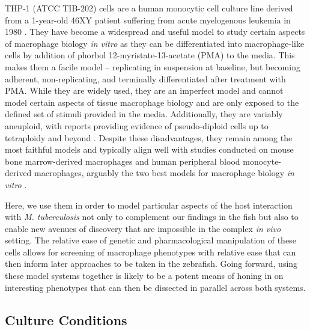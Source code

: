 THP-1 (ATCC TIB-202) cells are a human monocytic cell culture line derived from a 1-year-old 46XY patient suffering from acute myelogenous leukemia in 1980 \citep{Tsuchiya1980}. They have become a widespread and useful model to study certain aspects of macrophage biology \textit{in vitro} as they can be differentiated into macrophage-like cells by addition of phorbol 12-myristate-13-acetate (PMA) to the media. This makes them a facile model -- replicating in suspension at baseline, but becoming adherent, non-replicating, and terminally differentiated after treatment with PMA. While they are widely used, they are an imperfect model and cannot model certain aspects of tissue macrophage biology and are only exposed to the defined set of stimuli provided in the media. Additionally, they are variably aneuploid, with reports providing evidence of pseudo-diploid cells up to tetraploidy and beyond \citep{Odero2000, Adati2009, Kasai2022}. Despite these disadvantages, they remain among the most faithful models and typically align well with studies conducted on mouse bone marrow-derived macrophages and human peripheral blood monocyte-derived macrophages, arguably the two best models for macrophage biology \textit{in vitro} \citep{MendozaCoronel2016}. 

Here, we use them in order to model particular aspects of the host interaction with \textit{M. tuberculosis} not only to complement our findings in the fish but also to enable new avenues of discovery that are impossible in the complex \textit{in vivo} setting. The relative ease of genetic and pharmacological manipulation of these cells allows for screening of macrophage phenotypes with relative ease that can then inform later approaches to be taken in the zebrafish. Going forward, using these model systems together is likely to be a potent means of honing in on interesting phenotypes that can then be dissected in parallel across both systems. 

\subsection{Culture Conditions}\label{thp1culture}

